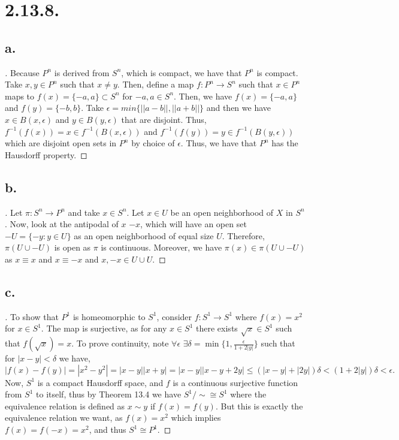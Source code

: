 \documentclass{article}
\begin{document}
\section*{2.13.8.}
\subsection*{a.}
\begin{proof}[\unskip\nopunct]
   Because $P^n$ is derived from $S^n$, which is compact, we 
   have that $P^n$ is compact. Take $x, y \in P^n$ such that $x \neq y$. Then, define a map $f:P^n \to S^n$ such that $x \in P^n$ maps to $f(x) = \{-a, a\} \subset S^n$ for $-a, a \in S^n$. Then, we have $f(x) = \{-a, a\}$ and $f(y) = \{-b, b\}$. 
   Take $\epsilon = min\{||a - b||, ||a + b|| \}$ and then we have $x \in B(x, \epsilon)$ and $y \in B(y, \epsilon)$ that are disjoint. Thus, $f^{-1}(f(x)) = x \in f^{-1}(B(x, \epsilon))$ and $f^{-1}(f(y)) = y \in f^{-1}(B(y, \epsilon))$ which are disjoint open sets in $P^n$ by choice of $\epsilon$. 
   Thus, we have that $P^n$ has the Hausdorff property. 

\end{proof}

\subsection*{b.}
\begin{proof}[\unskip\nopunct]
  Let $\pi:S^n \to P^n$ and take $x \in S^n$. Let $x \in U$ be an open neighborhood of $X$ in $S^n$. Now, look at the antipodal of $x$ $-x$, which will have an open set $-U = \{-y: y \in U\}$ as an open neighborhood of equal size $U$. Therefore, $\pi(U \cup -U)$ is open as $\pi$ is continuous.
  Moreover, we have $\pi(x) \in \pi(U \cup -U)$ as $x \equiv x$ and $x \equiv -x$ and $x, -x \in U \cup U$. 
\end{proof}

\subsection*{c.}
\begin{proof}[\unskip\nopunct]
  To show that $P^1$ is homeomorphic to $S^1$, consider $f:S^1 \to S^1$ where $f(x) = x^2$ for $x \in S^1$. The map is surjective, as for any $x \in S^1$ there exists $\sqrt{x} \in S^1$ such that $f(\sqrt{x}) = x$. 
  To prove continuity, note $\forall \epsilon$ $\exists \delta = \min\{1, \frac{\epsilon}{1 + 2|y|}\}$ such that for $|x - y| < \delta$ we have, 
  \[ |f(x) - f(y)| = |x^2 - y^2| = |x - y||x + y| = |x - y||x - y + 2y| \leq  (|x - y| + |2y|) \delta < (1 + 2|y|)\delta < \epsilon. \]
  Now, $S^1$ is a compact Hausdorff space, and $f$ is a continuous surjective function from $S^1$ to itself, thus by Theorem 13.4 we have $S^1/\sim \cong S^1$ where the equivalence relation is defined as $x \sim y$ if $f(x) = f(y)$. But this is exactly the equivalence relation we want, as
  $f(x) = x^2$ which implies $f(x) = f(-x) = x^2$, and thus $S^1 \cong P^1$. 
\end{proof}
\end{document}
